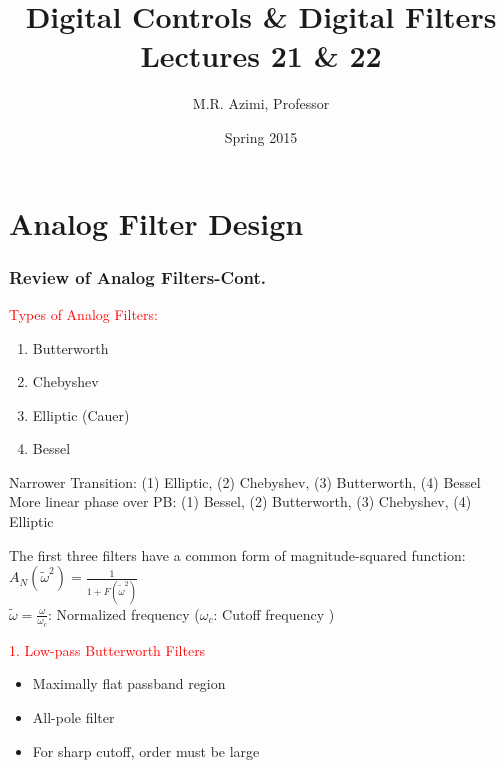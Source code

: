 \documentclass[mathserif, 10pt]{beamer} %
\title[Digital Control \& Digital Filters]{Digital Controls \& Digital Filters \\ Lectures 21 \& 22}
\author[M.R. Azimi]{M.R. Azimi, Professor}
\institute[CSU-ECE]{Department of Electrical and Computer Engineering \\ Colorado State University}
\date{Spring 2015}
\begin{document}

\frame{\titlepage}

\section{Analog Filter Design}
\frame
{
\small
\frametitle{Review of Analog Filters-Cont.}
\textcolor{red}{Types of Analog Filters:}\\
\begin{enumerate}
	\item Butterworth
	\item Chebyshev
	\item Elliptic (Cauer)
	\item Bessel
\end{enumerate}

Narrower Transition: (1) Elliptic, (2) Chebyshev, (3) Butterworth, (4) Bessel \\ \vspace{.05in}
More linear phase over PB: (1) Bessel, (2) Butterworth,  (3) Chebyshev, (4) Elliptic \\ \vspace{.1in}

\small
The first three filters have a common form of magnitude-squared function:\\ \vspace{.05in}
$A_N(\tilde\omega^2) = \frac{1}{1+F(\tilde\omega^2)}$\\ \vspace{.05in}
$\tilde \omega = \frac{\omega}{\omega_c}$: Normalized frequency ($\omega_c$: Cutoff frequency )\\ \vspace{.06in}

\textcolor{red}{1. Low-pass Butterworth Filters}\\
\begin{itemize}
	\item Maximally flat passband region
	\item All-pole filter
	\item For sharp cutoff, order must be large
\end{itemize}

}
\end{document}
